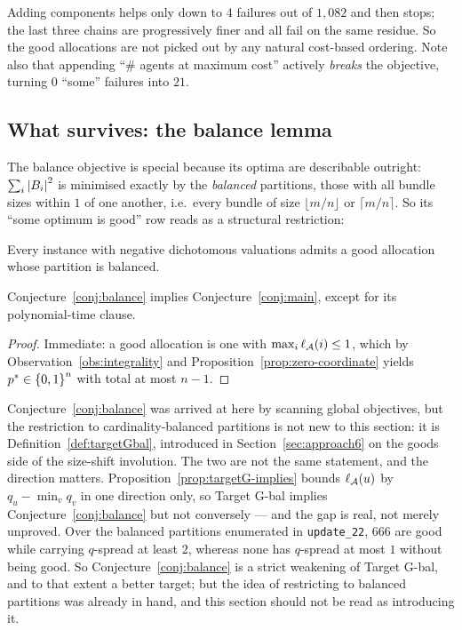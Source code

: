 Adding components helps only down to $4$ failures out of $1{,}082$ and then
stops; the last three chains are progressively finer and all fail on the same
residue. So the good allocations are not picked out by any natural cost-based
ordering. Note also that appending ``$\#$ agents at maximum cost'' actively
\emph{breaks} the objective, turning $0$ ``some'' failures into $21$.

\subsection{What survives: the balance lemma}

The balance objective is special because its optima are describable outright:
$\sum_i \left\lvert B_i\right\rvert^2$ is minimised exactly by the \emph{balanced} partitions,
those with all bundle sizes within $1$ of one another, i.e.\ every bundle of size
$\lfloor m/n \rfloor$ or $\lceil m/n \rceil$. So its ``some optimum is good'' row
reads as a structural restriction:

\begin{conjecture}
\label{conj:balance}
Every instance with negative dichotomous valuations admits a good allocation
whose partition is balanced.
\end{conjecture}

\begin{proposition}
\label{prop:balance-implies-main}
Conjecture~\ref{conj:balance} implies Conjecture~\ref{conj:main}, except for its
polynomial-time clause.
\end{proposition}

\begin{proof}
Immediate: a good allocation is one with $\max_i \ell_{\mathcal{A}}(i) \le 1$, which
by Observation~\ref{obs:integrality} and
Proposition~\ref{prop:zero-coordinate} yields $p^{*} \in \left\{0,1\right\}^n$ with
total at most $n-1$.
\end{proof}

\begin{remark}
\label{rem:balance-vs-targetGbal}
Conjecture~\ref{conj:balance} was arrived at here by scanning global objectives,
but the restriction to cardinality-balanced partitions is not new to this
section: it is Definition~\ref{def:targetGbal}, introduced in
Section~\ref{sec:approach6} on the goods side of the size-shift involution. The
two are not the same statement, and the direction matters.
Proposition~\ref{prop:targetG-implies} bounds $\ell_{\mathcal{A}}(u)$ by
$q_u - \min_v q_v$ in one direction only, so Target G-bal implies
Conjecture~\ref{conj:balance} but not conversely --- and the gap is real, not
merely unproved. Over the balanced partitions enumerated in
\texttt{update\_22}, $666$ are good while carrying $q$-spread at least $2$,
whereas none has $q$-spread at most $1$ without being good. So
Conjecture~\ref{conj:balance} is a strict weakening of Target G-bal, and to that
extent a better target; but the idea of restricting to balanced partitions was
already in hand, and this section should not be read as introducing it.
\end{remark}

